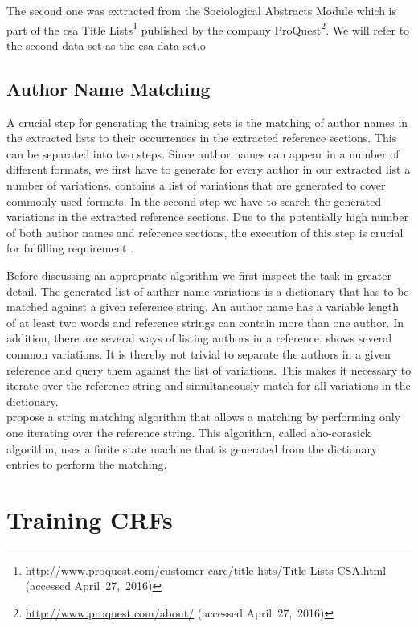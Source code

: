 The second one was extracted from the Sociological Abstracts Module which is part of the \gls{csa} Title Lists\footnote{\url{http://www.proquest.com/customer-care/title-lists/Title-Lists-CSA.html} (accessed April~27,~2016)} published by the company ProQuest\footnote{\url{http://www.proquest.com/about/} (accessed April~27,~2016)}.
We will refer to the second data set as the \gls{csa} data set.o


\subsection{Author Name Matching}

A crucial step for generating the training sets is the matching of author names in the extracted lists to their occurrences in the extracted reference sections.
This can be separated into two steps.
Since author names can appear in a number of different formats, we first have to generate for every author in our extracted list a number of variations.
 contains a list of variations that are generated to cover commonly used formats.
In the second step we have to search the generated variations in the extracted reference sections.
Due to the potentially high number of both author names and reference sections, the execution of this step is crucial for fulfilling requirement .

Before discussing an appropriate algorithm we first inspect the task in greater detail.
The generated list of author name variations is a dictionary that has to be matched against a given reference string.
An author name has a variable length of at least two words and reference strings can contain more than one author.
In addition, there are several ways of listing authors in a reference.
 shows several common variations.
It is thereby not trivial to separate the authors in a given reference and query them against the list of variations.
This makes it necessary to iterate over the reference string and simultaneously match for all variations in the dictionary.\\

\citet{aho1975efficient} propose a string matching algorithm that allows a matching by performing only one iterating over the reference string.
This algorithm, called \gls{aho-corasick algorithm}, uses a finite state machine that is generated from the dictionary entries to perform the matching.



\section{Training CRFs}\label{sec:ae-training-crfs}


